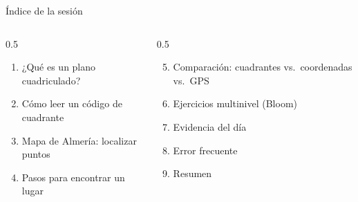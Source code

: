 \documentclass[aspectratio=169, 10pt, spanish]{beamer}
\begin{document}
\begin{frame}[plain]
  \titlepage
\end{frame}

\begin{frame}{Índice de la sesión}
  \begin{columns}[t]
    \begin{column}{0.5\textwidth}
      \begin{enumerate}
        \item ¿Qué es un plano cuadriculado?
        \item Cómo leer un código de cuadrante
        \item Mapa de Almería: localizar puntos
        \item Pasos para encontrar un lugar
      \end{enumerate}
    \end{column}
    \begin{column}{0.5\textwidth}
      \begin{enumerate}
        \setcounter{enumi}{4}
        \item Comparación: cuadrantes vs.\ coordenadas vs.\ GPS
        \item Ejercicios multinivel (Bloom)
        \item Evidencia del día
        \item Error frecuente
        \item Resumen
      \end{enumerate}
    \end{column}
  \end{columns}
\end{frame}

\end{document}
